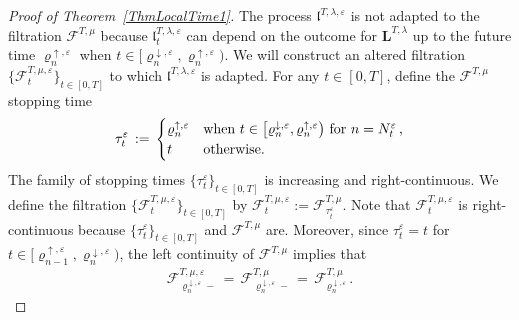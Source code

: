 \documentclass[10pt]{article}
\numberwithin{equation}{section}
\theoremstyle{definition}
\begin{document}
\begin{proof}[Proof of Theorem~\ref{ThmLocalTime1}]
The process $ \mathfrak{l}^{T,\lambda,\varepsilon}$ is not adapted to the filtration $\mathscr{F}^{T,\mu}$ because $ \mathfrak{l}^{T,\lambda,\varepsilon}_t$ can depend on the outcome for $\mathbf{L}^{T,\lambda}$ up to the future time $\varrho_{n}^{\uparrow,\varepsilon}$ when $t\in \big[ \varrho_{n}^{\downarrow ,\varepsilon},  \varrho_{n}^{\uparrow,\varepsilon} \big)$. We will construct an altered filtration $\{\boldsymbol{\mathscr{F}}_t^{T,\mu,\varepsilon}\}_{t\in [0,T]}$  to which  $ \mathfrak{l}^{T,\lambda,\varepsilon}$ is adapted.  For any $t\in [0,T]$, define the $\mathscr{F}^{T,\mu}$ stopping time
$$ \tau_{t}^{\varepsilon}\,:=\,\begin{cases} \varrho_{n}^{\uparrow,\varepsilon} & \text{when   $t\in \big[ \varrho_{n}^{\downarrow ,\varepsilon},  \varrho_{n}^{\uparrow,\varepsilon} \big)$ for $n=N_{t}^{\varepsilon}$\,,} \\ t  & \text{otherwise.}    \end{cases}  $$
  The family of stopping times $\{\tau_{t}^{\varepsilon}\}_{t\in [0,T]}$ is increasing and right-continuous.  We define the filtration  $\{\boldsymbol{\mathscr{F}}_t^{T,\mu,\varepsilon}\}_{t\in [0,T]}$ by   $\boldsymbol{\mathscr{F}}_t^{T,\mu,\varepsilon}:= \mathscr{F}_{\tau_{t}^{\varepsilon}}^{T,\mu} $.  Note that $\boldsymbol{\mathscr{F}}_t^{T,\mu,\varepsilon}$
  is   right-continuous because $\{\tau_{t}^{\varepsilon}\}_{t\in [0,T]}$ and $ \mathscr{F}^{T,\mu}$ are. Moreover, since $\tau_t^{\varepsilon}=t$ for $t\in \big[ \varrho_{n-1}^{\uparrow ,\varepsilon},  \varrho_{n}^{\downarrow,\varepsilon} \big)$, the left  continuity of $\mathscr{F}^{T,\mu}$ implies that 
\begin{align}\label{FLeft}
\mathscr{F}_{\varrho_{n}^{\downarrow,\varepsilon}-}^{T,\mu,\varepsilon}\,=\,\mathscr{F}_{\varrho_{n}^{\downarrow, \varepsilon}-}^{T,\mu} \,=\,\mathscr{F}_{\varrho_{n}^{\downarrow,\varepsilon}}^{T,\mu} \,.
\end{align}


\end{proof}
\end{document}

